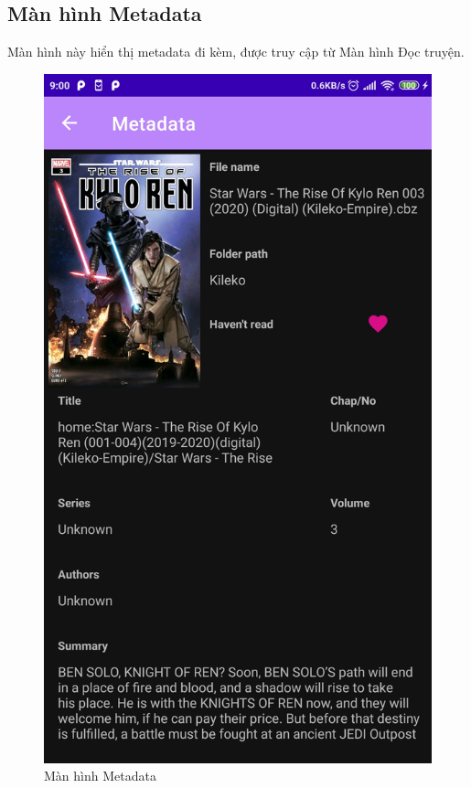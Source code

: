 \documentclass[../../thesis]{subfiles}
\begin{document}
\subsection{Màn hình Metadata}

Màn hình này hiển thị metadata đi kèm, được truy cập từ Màn hình Đọc truyện.

\begin{figure}[H]
    \centering
    \includegraphics[scale=0.12]{../images/Screenshot_2021-05-17-09-00-17-548_com.uet.nvmnghia.yacv}
    \caption{Màn hình Metadata}
    \label{fig:metadata_screen}
\end{figure}
\end{document}
